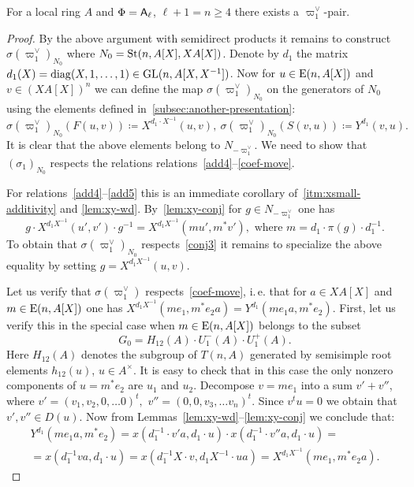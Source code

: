 \begin{prop} \label{prop:sigma-construction}
    For a local ring $A$ and $\Phi = \mathsf{A}_\ell$, $\ell + 1 = n \geq 4$ there exists a $\varpi_1^\vee$-pair.
\end{prop}
\begin{proof}
    By the above argument with semidirect products it remains to construct $\sigma(\varpi_1^\vee)_{N_0}$ where $N_0 = \operatorname{St}(n, A[X], XA[X])$.
    Denote by $d_1$ the matrix $d_1(X) = \mathrm{diag}(X, 1, \ldots, 1) \in \operatorname{GL}(n, A[X, X^{-1}])$.
    Now for $u \in \operatorname{E}(n, A[X])$ and $v \in (XA[X])^n$ we can define the map $\sigma(\varpi_1^\vee)_{N_0}$ on the generators of $N_{0}$
    using the elements defined in~\cref{subsec:another-presentation}:
    \begin{equation*}
    \sigma(\varpi_1^\vee)_{N_0} (F(u, v)) \coloneqq X^{d_1 \cdot X^{-1}}(u, v),\ \sigma(\varpi_1^\vee)_{N_0} (S(v, u)) \coloneqq Y^{d_1}(v, u).
    \end{equation*}
    It is clear that the above elements belong to $N_{-\varpi_1^\vee}$.
    We need to show that $(\sigma_1)_{N_0}$ respects the relations relations~\eqref{add4}--\eqref{coef-move}.

    For relations~\eqref{add4}--\eqref{add5} this is an immediate corollary of~\cref{itm:xsmall-additivity} and \cref{lem:xy-wd}.
    By~\cref{lem:xy-conj} for $g \in N_{-\varpi_1^\vee}$ one has
    \begin{equation}
        \label{eq:xy-conj-n1}
        g \cdot X^{d_1 X^{-1}}(u', v') \cdot g^{-1} = X^{d_1 X^{-1}}(mu', m^*v'), \text{ where } m = d_1 \cdot \pi(g) \cdot d_1^{-1}.
    \end{equation}
    To obtain that $\sigma(\varpi_1^\vee)_{N_0}$ respects~\eqref{conj3} it remains to specialize the above equality by setting $g = X^{d_1 X^{-1}}(u, v)$.

    Let us verify that $\sigma(\varpi^\vee_1)$ respects~\eqref{coef-move}, i.\,e. that for $a\in XA[X]$ and $m \in \operatorname{E}(n, A[X])$ one has
    $X^{d_1 X^{-1}}(me_1, m^*e_2 a) = Y^{d_1}(me_1 a, m^* e_2)$.
    First, let us verify this in the special case when $m \in \operatorname{E}(n, A[X])$ belongs to the subset
    \[G_0 = H_{12}(A) \cdot U^-_1(A) \cdot U^+_1(A).\]
    Here $H_{12}(A)$ denotes the subgroup of $T(n, A)$ generated by semisimple root elements $h_{12}(u)$, $u \in A^\times$.
    It is easy to check that in this case the only nonzero components of $u = m^* e_2$ are $u_1$ and $u_2$.
    Decompose $v = m e_1$ into a sum $v' + v''$, where $v' = (v_1, v_2, 0, \ldots 0)^t,$ $v'' = (0, 0, v_3, \ldots v_n)^t$.
    Since $v^t u = 0$ we obtain that $v', v'' \in D(u)$.
    Now from Lemmas~\ref{lem:xy-wd}--\ref{lem:xy-conj} we conclude that:
    \begin{multline}
        \label{eq:special-case}
        Y^{d_1}(me_{1}a, m^* e_2) = x(d_1^{-1} \cdot v'a, d_1\cdot  u) \cdot x(d_1^{-1}\cdot v''a, d_1 \cdot u) = \\
        = x(d_1^{-1} va, d_1 \cdot u) = x(d_1^{-1}X \cdot v, d_{1}X^{-1} \cdot u a) = X^{d_1 X^{-1}}(me_1, m^*e_2 a).
    \end{multline}


\end{proof}

